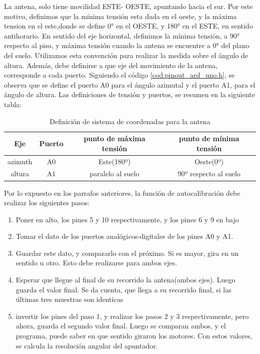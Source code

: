 La antena, solo tiene movilidad ESTE- OESTE, apuntando hacia el sur. Por este motivo, definimos que la mínima tensión esta dada en el oeste, y la máxima tension en el este,donde se define 0° en el OESTE, y 180° en el ESTE, en sentido antihorario. En sentido del eje horizontal, definimos la mínima tensión, a 90° respecto al piso, y máxima tensión cuando la antena se encuentre a 0° del plano del suelo. Utilizamos esta convención para realizar la medida sobre el ángulo de altura. Además, debe definirse a que eje del movimiento de la antena, corresponde a cada puerto. Siguiendo el código \ref{cod:pinout_ard_uno.h}, se observa que se define el puerto A0 para el ángulo azimutal y el puerto A1, para el ángulo de altura. Las definiciones de tensión y puertos, se resumen en la siguiente tabla: 
\begin{table}[ht]
	\centering 
	\begin{tabular}{|c|c|c|c|}
		\hline
		Eje & Puerto & punto de máxima tensión & punto de mínima tensión\\ 
		\hline
		azimuth &A0 & Este(180º) & Oeste(0º) 	 \\    
		\hline
		altura  &A1 &  paralelo al suelo& 90º respecto al suelo  \\
		\hline
	\end{tabular}
	\caption{Definición de sistema de coordenadas para la antena}
	\label{tab:def_sist_coord}
\end{table}

Por lo expuesto en los parrafos anteriores, la función de autocalibración debe realizar los siguientes pasos: 

\begin{enumerate}
	\item Poner en alto, los pines 5 y 10 respectivamente, y los pines 6 y 9 en bajo  
	\item Tomar el dato de los puertos analógicos-digitales de los pines A0 y A1. 
	\item Guardar este dato, y compararlo con el próximo. Si es mayor, gira en un sentido u otro. Esto debe realizarse para ambos ejes. 
	\item Esperar que llegue al final de su recorrido la antena(ambos ejes). Luego guarda el valor final. Se da cuenta, que llega a su recorrido final, si las últimas tres muestras son identicas
   \item invertir los pines del paso 1, y realizar los pasos 2 y 3 respectivamente, pero ahora, guarda el segundo valor final. Luego se comparan ambos, y el programa, puede saber en que sentido giraron los motores. Con estos valores, se calcula la resolución angular del apuntador. 
\end{enumerate}

